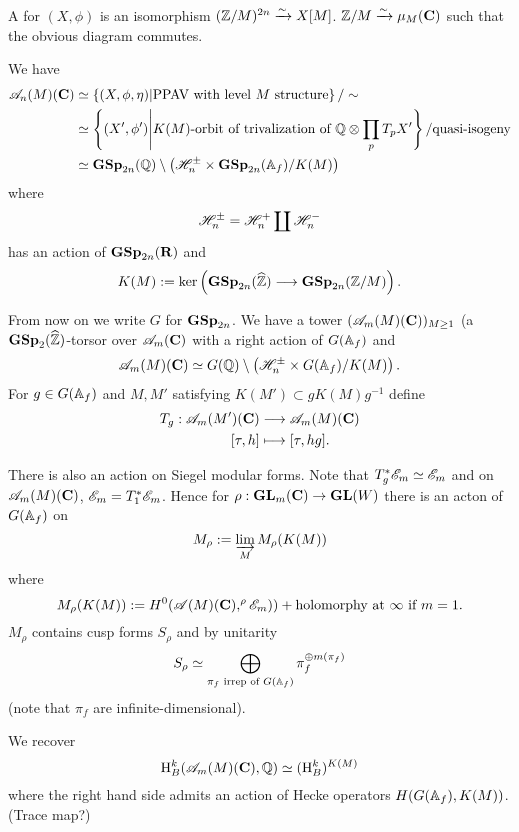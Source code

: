 \begin{definition}
	A  for $(X,\phi)$ is an isomorphism $(\mathbb Z /M)^{2n}\xrightarrow{\sim} X[M]$. $\mathbb Z
	/M\xrightarrow{\sim} \mu_M(\mathbf{C})$ such that the obvious diagram commutes.
\end{definition}
We have
\begin{align*}
	\mathscr{A}_n(M)(\mathbf{C}) &\simeq \left\{ (X,\phi,\eta) \middle| \text{PPAV with level }M\text{
	structure} \right\} / \sim \\
	&\simeq \left\{ (X',\phi') \middle| K(M)\text{-orbit of trivalization of }\mathbb Q\otimes
	\prod_p T_pX' \right\} / \text{quasi-isogeny} \\
	&\simeq \mathbf{GSp}_{2n}(\mathbb Q) \setminus \left( \mathscr H_n^{\pm}\times \mathbf{GSp}_{2n}(\mathbb{A}_f) /K(M) \right)
\end{align*}
where
\[
	\mathscr H_n^{\pm} = \mathscr H_n^{+} \coprod \mathscr H_n^{-}
\]
has an action of $\mathbf{GSp}_{2n}(\mathbf{R})$ and
\[
	K(M) \defeq \ker \left( \GSp_{2n}(\wh{\Z}) \to \GSp_{2n}(\Z /M) \right) .
\]

From now on we write $G$ for $\mathbf{GSp}_{2n}$.
We have a tower $(\mathscr{A}_m(M)(\mathbf{C}))_{M\ge 1}$ (a $\mathbf{GSp}_2(\widehat{\mathbb Z})$-torsor over $\mathscr{A}_m(\mathbf{C})$
	with a right action of $G(\mathbb{A}_f)$ and
	\[
		\mathscr{A}_m(M)(\mathbf{C}) \simeq G(\mathbb Q) \setminus \left( \mathscr H_n^{\pm} \times G(\mathbb{A}_f) /K(M) \right) .
	\]
	For $g\in G(\mathbb{A}_f)$ and $M,M'$ satisfying $K(M')\subset gK(M)g^{-1}$ define
	\begin{align*}
		T_g: \mathscr{A}_m(M')(\mathbf{C}) &\longrightarrow \mathscr{A}_m(M)(\mathbf{C}) \\
		[\tau, h] &\longmapsto [\tau, hg].
	\end{align*}

	There is also an action on Siegel modular forms. Note that $T_g^{*}\mathscr{E}_m\simeq \mathscr{E}_m$
	and on $\mathscr{A}_m(M)(\mathbf{C})$, $\mathscr{E}_m=T_1^{*}\mathscr{E}_m$. Hence  for $\rho:\GL_m(\C)\to \GL(W)$ there
	is an acton of $G(\mathbb{A}_f)$ on
	\[
		M_\rho := \varinjlim_M M_\rho(K(M))
	\]
	where
	\[
	M_\rho(K(M)) := H^{0}(\mathscr{A}(M)(\mathbf{C}), ^{\rho}\mathscr{E}_m)) + \text{holomorphy at }\infty\text{ if }m=1.
\]
$M_\rho$ contains cusp forms $S_\rho$ and by unitarity
\[
	S_\rho \simeq \bigoplus_{\pi_f\text{ irrep of }G(\mathbb{A}_f)}\pi_f^{\oplus m(\pi_f)}
\]
(note that $\pi_f$ are infinite-dimensional).

We recover
\[
	\mathrm{H}_B^{k}(\mathscr{A}_m(M)(\mathbf{C}),\mathbb Q) \simeq (\mathrm{H}_B^{k})^{K(M)}
\]
where the right hand side admits an action of Hecke operators $H(G(\mathbb{A}_f),K(M))$. (Trace map?)

